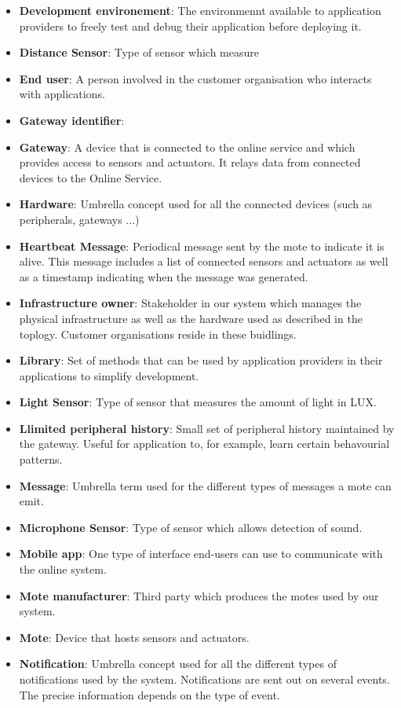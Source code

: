 \documentclass[english]{sareport}
\begin{document}
\begin{itemize}
	\item \textbf{Development environement}: The environmennt available to application providers to freely test and debug their application before deploying it.
	\item \textbf{Distance Sensor}: Type of sensor which measure 
	\item \textbf{End user}: A person involved in the customer organisation who interacts with applications.
	\item \textbf{Gateway identifier}: 
	\item \textbf{Gateway}: A device that is connected to the online service and which provides access to sensors and actuators. It relays data from connected devices to the Online Service.
	\item \textbf{Hardware}: Umbrella concept used for all the connected devices (such as peripherals, gateways ...)
	\item \textbf{Heartbeat Message}: Periodical message sent by the mote to indicate it is alive. This message includes a list of connected sensors and actuators as well as a timestamp indicating when the message was generated.
	\item \textbf{Infrastructure owner}: Stakeholder in our system which manages the physical infrastructure as well as the hardware used as described in the toplogy. Customer organisations reside in these buidlings.
	\item \textbf{Library}: Set of methods that can be used by application providers in their applications to simplify development.
	\item \textbf{Light Sensor}: Type of sensor that measures the amount of light in LUX.
	\item \textbf{Llimited peripheral history}: Small set of peripheral history maintained by the gateway. Useful for application to, for example, learn certain behavourial patterns.
	\item \textbf{Message}: Umbrella term used for the different types of messages a mote can emit.
	\item \textbf{Microphone Sensor}: Type of sensor which allows detection of sound. 
	\item \textbf{Mobile app}: One type of interface end-users can use to communicate with the online system.
	\item \textbf{Mote manufacturer}: Third party which produces the motes used by our system.
	\item \textbf{Mote}: Device that hosts sensors and actuators.
	\item \textbf{Notification}: Umbrella concept used for all the different types of notifications used by the system. Notifications are sent out on several events. The precise information depends on the type of event.

\end{itemize}
\end{document}
